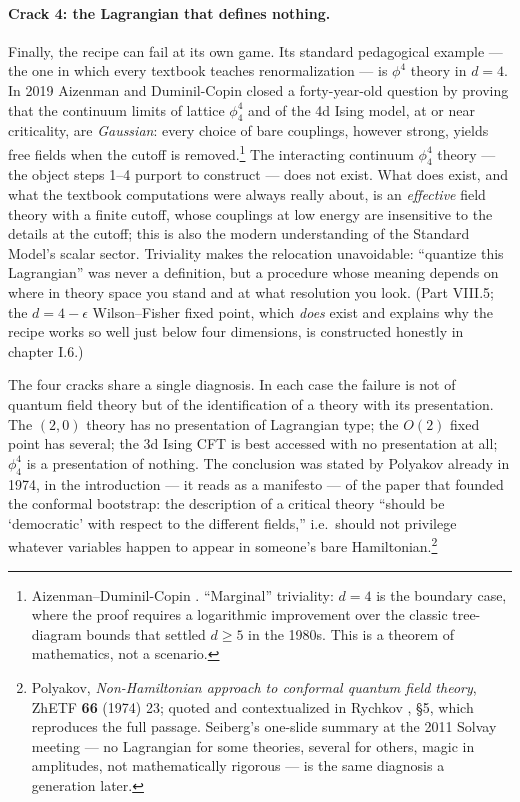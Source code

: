 \paragraph{Crack 4: the Lagrangian that defines nothing.}
Finally, the recipe can fail at its own game. Its standard pedagogical example
--- the one in which every textbook teaches renormalization --- is $\phi^4$
theory in $d = 4$. In 2019 Aizenman and Duminil-Copin closed a forty-year-old
question by proving that the continuum limits of lattice $\phi^4_4$ and of the
4d Ising model, at or near criticality, are \emph{Gaussian}: every choice of
bare couplings, however strong, yields free fields when the cutoff is
removed.\footnote{Aizenman--Duminil-Copin . ``Marginal''
triviality: $d=4$ is the boundary case, where the proof requires a logarithmic
improvement over the classic tree-diagram bounds that settled $d \ge 5$ in the
1980s. This is a theorem of mathematics, not a scenario.} The interacting
continuum $\phi^4_4$ theory --- the object steps 1--4 purport to construct ---
does not exist. What does exist, and what the textbook computations were always
really about, is an \emph{effective} field theory with a finite cutoff, whose
couplings at low energy are insensitive to the details at the cutoff; this is
also the modern understanding of the Standard Model's scalar sector. Triviality
makes the relocation unavoidable: ``quantize this Lagrangian'' was never a
definition, but a procedure whose meaning depends on where in theory space you
stand and at what resolution you look. (Part VIII.5; the $d = 4-\epsilon$
Wilson--Fisher fixed point, which \emph{does} exist and explains why the recipe
works so well just below four dimensions, is constructed honestly in chapter
I.6.)

\medskip

\noin The four cracks share a single diagnosis. In each case the failure is not of quantum
field theory but of the identification of a theory with its presentation.
The $(2,0)$ theory has no presentation of Lagrangian type; the $O(2)$
fixed point has several; the 3d Ising CFT is best accessed with no
presentation at all; $\phi^4_4$ is a presentation of nothing. The
conclusion was stated by Polyakov already in 1974, in the introduction ---
it reads as a manifesto --- of the paper that founded the conformal
bootstrap: the description of a critical theory ``should be `democratic'
with respect to the different fields,'' i.e.\ should not privilege
whatever variables happen to appear in someone's bare
Hamiltonian.\footnote{Polyakov, \emph{Non-Hamiltonian approach to
conformal quantum field theory}, ZhETF \textbf{66} (1974) 23; quoted and
contextualized in Rychkov , \S5, which reproduces the
full passage. Seiberg's one-slide summary at the 2011 Solvay meeting ---
no Lagrangian for some theories, several for others, magic in amplitudes,
not mathematically rigorous --- is the same diagnosis a generation later.}

